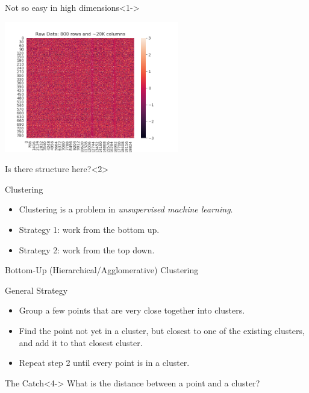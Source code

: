 \documentclass[colorlinks=true,linkcolor=blue]{beamer}
\begin{document}
\begin{frame}
  \begin{block}{Not so easy in high dimensions}<1->
\begin{center}
    \includegraphics[width=3in]{../png/basic_image.png}
\end{center}
\end{block}
\begin{block}{Is there structure here?}<2>
  \end{block}
\end{frame}
\begin{frame}{Clustering}
  \begin{itemize}
  \item <1-> Clustering is a problem in {\it unsupervised machine learning}.
  \item <2-> Strategy 1: work from the bottom up.
  \item <3-> Strategy 2: work from the top down.
  \end{itemize}
\end{frame}
\begin{frame}{Bottom-Up (Hierarchical/Agglomerative) Clustering}

  \begin{block}{General Strategy}
    \begin{itemize}
    \item <1-> Group a few points that are very close together into clusters.
    \item<2-> Find the point not yet in a cluster, but closest to one of the existing clusters,
      and  add it to that closest cluster.
    \item<3-> Repeat step 2 until every point is in a cluster.
    \end{itemize}
  \end{block}
  \begin{block}{The Catch}<4->
    What is the distance between a point and a cluster?
    \end{block}
\end{frame}
\end{document}
